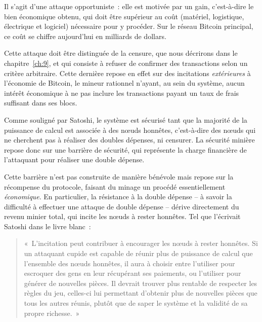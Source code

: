 Il s'agit d'une attaque opportuniste~: elle est motivée par un gain, c'est-à-dire le bien économique obtenu, qui doit être supérieur au coût (matériel, logistique, électrique et logiciel) nécessaire pour y procéder. Sur le réseau Bitcoin principal, ce coût se chiffre aujourd'hui en milliards de dollars.

Cette attaque doit être distinguée de la censure, que nous décrirons dans le chapitre~\ref{ch:9}, et qui consiste à refuser de confirmer des transactions selon un critère arbitraire. Cette dernière repose en effet sur des incitations \emph{extérieures} à l'économie de Bitcoin, le mineur rationnel n'ayant, au sein du système, aucun intérêt économique à ne pas inclure les transactions payant un taux de frais suffisant dans ses blocs.


Comme souligné par Satoshi, le système est sécurisé tant que la majorité de la puissance de calcul est associée à des nœuds honnêtes, c'est-à-dire des nœuds qui ne cherchent pas à réaliser des doubles dépenses, ni censurer. La sécurité minière repose donc sur une barrière de sécurité, qui représente la charge financière de l'attaquant pour réaliser une double dépense.

Cette barrière n'est pas construite de manière bénévole mais repose sur la récompense du protocole, faisant du minage un procédé essentiellement \emph{économique}. En particulier, la résistance à la double dépense -- à savoir la difficulté à effectuer une attaque de double dépense -- dérive directement du revenu minier total, qui incite les nœuds à rester honnêtes. Tel que l'écrivait Satoshi dans le livre blanc~:

\begin{quote}
«~L'incitation peut contribuer à encourager les nœuds à rester honnêtes. Si un attaquant cupide est capable de réunir plus de puissance de calcul que l'ensemble des nœuds honnêtes, il aura à choisir entre l'utiliser pour escroquer des gens en leur récupérant ses paiements, ou l'utiliser pour générer de nouvelles pièces. Il devrait trouver plus rentable de respecter les règles du jeu, celles-ci lui permettant d'obtenir plus de nouvelles pièces que tous les autres réunis, plutôt que de saper le système et la validité de sa propre richesse.~»
\end{quote}

